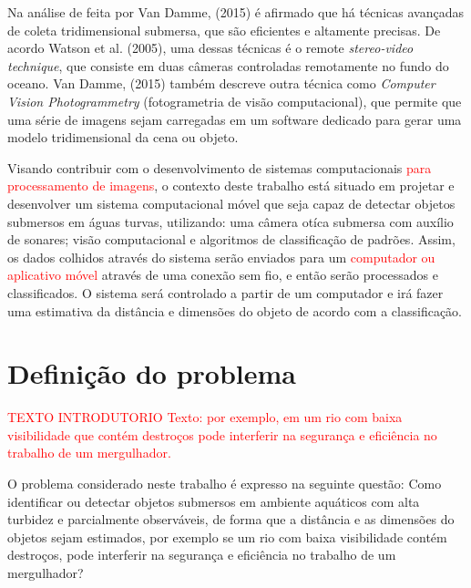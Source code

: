 Na análise de feita por Van Damme, (2015) é afirmado que há técnicas avançadas de coleta tridimensional submersa, que são eficientes e altamente precisas. De acordo Watson et al. (2005), uma dessas técnicas é o remote \textit{stereo-video technique}, que consiste em duas câmeras controladas remotamente no fundo do oceano. Van Damme, (2015) também descreve outra técnica como \textit{Computer Vision Photogrammetry} (fotogrametria de visão computacional), que permite que uma série de imagens sejam carregadas em um software dedicado para gerar uma modelo tridimensional da cena ou objeto.


Visando contribuir com o desenvolvimento de sistemas computacionais \textcolor{red}{para processamento de imagens}, o contexto deste trabalho está situado em projetar e desenvolver um sistema computacional móvel que seja capaz de detectar objetos submersos em águas turvas, utilizando: uma câmera otíca submersa com auxílio de sonares; visão computacional e algoritmos de classificação de padrões. Assim, os dados colhidos através do sistema serão enviados para um \textcolor{red}{computador ou aplicativo móvel} através de uma conexão sem fio, e então serão processados e classificados. O sistema será controlado a partir de um computador e irá fazer uma estimativa da distância e dimensões do objeto de acordo com a classificação.


\section{Definição do problema} 

\textcolor{red}{TEXTO INTRODUTORIO Texto:  por exemplo, em um rio com baixa visibilidade que contém destroços pode interferir na segurança e eficiência no trabalho de um mergulhador.}


O problema considerado neste trabalho é expresso na seguinte questão: Como identificar ou detectar objetos submersos em ambiente aquáticos com alta turbidez e parcialmente observáveis, de forma que a distância e as dimensões do objetos sejam estimados, por exemplo se um rio com baixa visibilidade contém destroços, pode interferir na segurança e eficiência no trabalho de um mergulhador?


